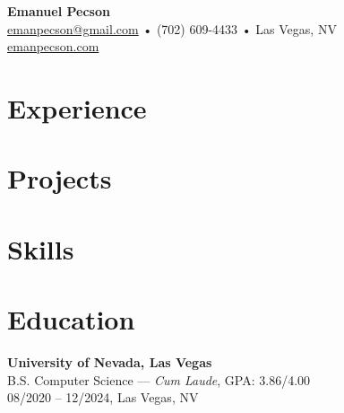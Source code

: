 \documentclass[a4paper,10pt]{article}
\begin{document}
\begin{center}
    \textbf{\Huge Emanuel Pecson} \\
    \href{mailto:emanpecson@gmail.com}{emanpecson@gmail.com} • (702) 609-4433 • Las Vegas, NV \\
    \href{https://emanpecson.com}{emanpecson.com}
\end{center}

\vspace{0.5em}

\section*{Experience}




\section*{Projects}



\section*{Skills}


\section*{Education}
\textbf{University of Nevada, Las Vegas} \\
B.S. Computer Science — \textit{Cum Laude}, GPA: 3.86/4.00 \\
08/2020 – 12/2024, Las Vegas, NV
\end{document}
